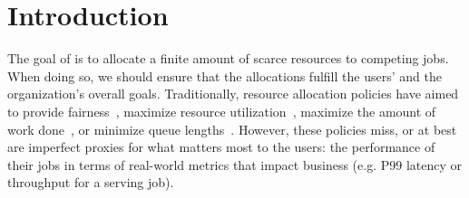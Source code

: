 
\section{Introduction}
\label{sec:cilantro_intro}




The goal of  is to allocate a finite amount of
scarce resources to competing jobs.
When doing so, we should ensure that the allocations fulfill the users' and the
organization's overall goals.
% 
Traditionally, resource allocation policies have aimed to
provide fairness~\cite{ghodsi2011dominant,demers1989analysis},
maximize resource utilization~\cite{gandiva},
maximize the amount of work done~\cite{ghodsi2011dominant},
or
minimize queue lengths~\cite{racksched,sparrow}.
% 
However,
these policies miss, or at best are imperfect proxies for what matters most to the users:
the performance of their jobs in terms of real-world metrics that impact business
(e.g. P99 latency or throughput for a serving job).


\insertResUtilIllus

